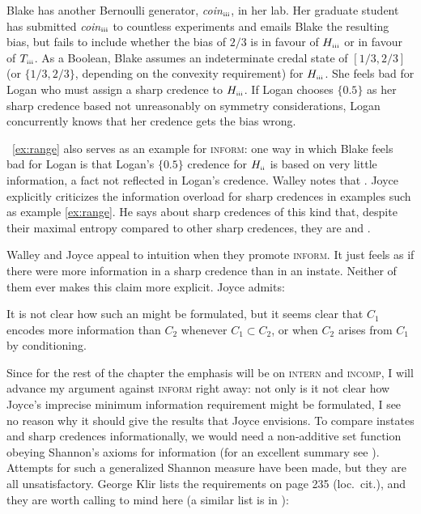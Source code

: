 \documentclass[phd,12pt,oneside]{ubcthesis}
\begin{document}
\begin{quotex}
  \label{ex:incomp} Blake has another Bernoulli
  generator, \textit{coin}$_{\mbox{\tiny{iii}}}$, in her lab. Her
  graduate student has submitted \textit{coin}$_{\mbox{\tiny{iii}}}$
  to countless experiments and emails Blake the resulting bias, but
  fails to include whether the bias of $2/3$ is in favour of
  $H_{\mbox{\tiny{iii}}}$ or in favour of $T_{\mbox{\tiny{iii}}}$. As
  a Boolean, Blake assumes an indeterminate credal state of
  $[1/3,2/3]$ (or $\{1/3,2/3\}$, depending on the convexity
  requirement) for $H_{\mbox{\tiny{iii}}}$. She feels bad for Logan
  who must assign a sharp credence to $H_{\mbox{\tiny{iii}}}$. If
  Logan chooses $\{0.5\}$ as her sharp credence based not unreasonably
  on symmetry considerations, Logan concurrently knows that her
  credence gets the bias wrong.
\end{quotex}

{\Xample}~\ref{ex:range} also serves as an example for \textsc{inform}:
one way in which Blake feels bad for Logan is that Logan's $\{0.5\}$
credence for $H_{\mbox{\tiny{ii}}}$ is based on very little
information, a fact not reflected in Logan's credence. Walley notes
that 
. Joyce explicitly criticizes the information
overload for sharp credences in examples such as example
\ref{ex:range}. He says about sharp credences of this kind that,
despite their maximal entropy compared to other sharp credences, they
are  and  .

Walley and Joyce appeal to intuition when they promote
\textsc{inform}. It just feels as if there were more information in a
sharp credence than in an instate. Neither of them ever makes this
claim more explicit. Joyce admits:

\begin{quotex}
  It is not clear how such an  might be formulated, but it seems clear that $C_{1}$
  encodes more information than $C_{2}$ whenever
  $C_{1}\subset{}C_{2}$, or when $C_{2}$ arises from $C_{1}$ by
  conditioning. 
\end{quotex}

Since for the rest of the chapter the emphasis will be on
\textsc{intern} and \textsc{incomp}, I will advance my argument
against \textsc{inform} right away: not only is it not clear how
Joyce's imprecise minimum information requirement might be formulated,
I see no reason why it should give the results that Joyce envisions.
To compare instates and sharp credences informationally, we would need
a non-additive set function obeying Shannon's axioms for information
(for an excellent summary see ). Attempts for such
a generalized Shannon measure have been made, but they are all
unsatisfactory. George Klir lists the requirements on page 235 (loc.\
cit.), and they are worth calling to mind here (a similar list is in
\scite{8}{mork13}{363}):
\end{document}

